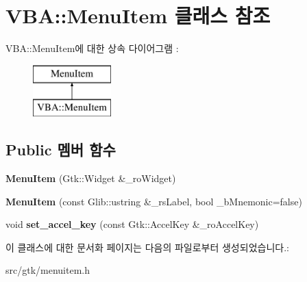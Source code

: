\hypertarget{class_v_b_a_1_1_menu_item}{}\section{V\+BA\+:\+:Menu\+Item 클래스 참조}
\label{class_v_b_a_1_1_menu_item}
V\+BA\+:\+:Menu\+Item에 대한 상속 다이어그램 \+: \begin{figure}[H]
\begin{center}
\leavevmode
\includegraphics[height=2.000000cm]{class_v_b_a_1_1_menu_item}
\end{center}
\end{figure}
\subsection*{Public 멤버 함수}
\begin{DoxyCompactItemize}
\item 
\mbox{\label{class_v_b_a_1_1_menu_item_a4fd75eb019ae756ae60bc0699bf8b101}} 
{\bfseries Menu\+Item} (Gtk\+::\+Widget \&\+\_\+ro\+Widget)
\item 
\mbox{\label{class_v_b_a_1_1_menu_item_afa20a05e88460b0b601c4cd2a4217298}} 
{\bfseries Menu\+Item} (const Glib\+::ustring \&\+\_\+rs\+Label, bool \+\_\+b\+Mnemonic=false)
\item 
\mbox{\label{class_v_b_a_1_1_menu_item_aa29889bacc86ccf386e0225b7f03e5be}} 
void {\bfseries set\+\_\+accel\+\_\+key} (const Gtk\+::\+Accel\+Key \&\+\_\+ro\+Accel\+Key)
\end{DoxyCompactItemize}


이 클래스에 대한 문서화 페이지는 다음의 파일로부터 생성되었습니다.\+:\begin{DoxyCompactItemize}
\item 
src/gtk/menuitem.\+h\end{DoxyCompactItemize}
